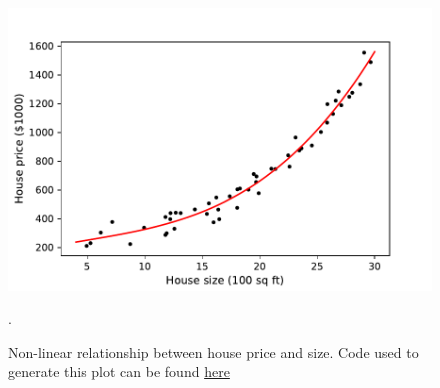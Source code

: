 \documentclass{article}
\begin{document}
\begin{figure}[ht]
\centering
\includegraphics[scale=0.7]{images/lin_reg/poly-data.pdf}
\caption{Non-linear relationship between house price and size. Code used to generate this plot can be found \href{https://github.com/siavashaslanbeigi/ml_notes_supp/blob/master/lin_reg/poly.ipynb}{\color{blue} here}}.
\label{linreg-fig:poly-data}
\end{figure}
\end{document}
